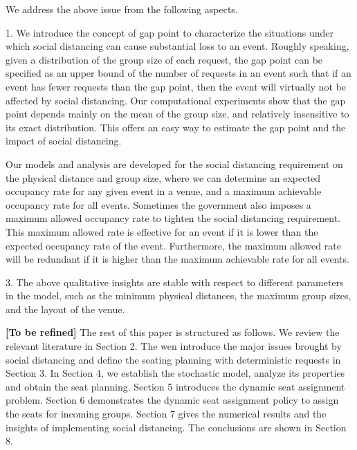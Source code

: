We address the above issue from the following aspects.


1. We introduce the concept of gap point to characterize the situations under which social distancing can cause substantial loss to an event. Roughly speaking, given a distribution of the group size of each request, the gap point can be specified as an upper bound of the number of requests in an event such that if an event has fewer requests than the gap point, then the event will virtually not be affected by social distancing. Our computational experiments show that the gap point depends mainly on the mean of the group size, and relatively insensitive to its exact distribution. This offers an easy way to estimate the gap point and  the impact of social distancing.


Our models and analysis are developed for the social distancing requirement on the physical distance and group size, where we can determine an expected occupancy rate for any given event in a venue, and a maximum achievable occupancy rate for all events. Sometimes the government also imposes a maximum allowed occupancy rate to tighten the social distancing requirement. This maximum allowed rate is effective for an event if it is lower than the expected occupancy rate of the event. Furthermore, the maximum allowed rate will be redundant if it is higher than the maximum achievable rate for all events.

3. The above qualitative insights are stable with respect to different parameters in the model, such as the minimum physical distances, the maximum group sizes, and the layout of the venue. 

{\bf [To be refined] } The rest of this paper is structured as follows. We review the relevant literature in Section 2. The wen introduce the 
 major issues brought by social distancing and define the seating planning with deterministic requests in Section 3. In Section 4, we establish the stochastic model, analyze its properties and obtain the seat planning. Section 5 introduces the dynamic seat assignment problem.
Section 6 demonstrates the dynamic seat assignment policy to assign the seats for incoming groups. Section 7 gives the numerical results and the insights of implementing social distancing. The conclusions are shown in Section 8.
\newpage
